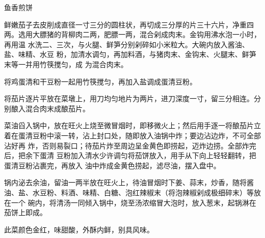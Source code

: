 \begin{recipe}{鱼香煎饼}

\ingredients


\preparation

\step 鲜嫩茄子去皮削成直径一寸三分的圆柱状，再切成三分厚的片三十六片，净重四
两。选用大膘猪的背柳肉二两，肥膘一两，混合剁成肉末。金钩用沸水泡一小时，再用温
水洗二、三次，与火腿、鲜笋分别剁碎如小米粒大。大碗内放入酱油、盐、味精、水豆
粉，加清水调匀，再加料酒，与猪肉末、金钩末、火腿末、鲜笋末等一并用竹筷搅匀，成
为混合肉末。

\step 将鸡蛋清和干豆粉一起用竹筷搅匀，再加入盐调成蛋清豆粉。

\step 将茄片逐片平放在菜墩上，用刀均匀地片为两片，进刀深度一寸，留三分相连。分
别酿入混合肉末成酿茄片。

\step 菜油舀入锅中，放在旺火上烧至微冒烟时，即移微火上；然后用手逐一将酿茄片立
着在蛋清豆粉中滚一转，沾上封口处，随即放入油锅中炸；要边沾边炸，不可全部沾好再
炸，否则易裂口；待茄片炸至周边呈金黄色即捞起，迈炸边捞。全部炸完后，把余下蛋清
豆粉加入清水少许调匀将茄饼放入，用手从下向上轻轻翻转，把蛋清豆粉沾裹完，再放入
油中炸成金黄色捞起，滤尽油，摆入盘中。

\step 锅内泌去余油，留油一两半放在旺火上，待油冒烟时下姜、蒜末，炒香，随将酱
油、盐、水豆粉、料酒、味精、白糖、泡红辣椒末（将泡辣椒剁成极细碎末）等放在一个
碗内，将清汤一同倾入锅中，烧至汤浓缩冒大泡时，放入葱末，起锅淋在茄饼上即成。

\features

此菜颜色金红，味甜酸，外酥内鲜，别具风味。

\end{recipe}

